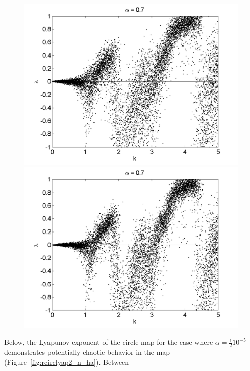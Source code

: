 \begin{figure}[!h]
\includegraphics[width=.5\textwidth]{figs/rcirc_n_lyap_L_05_k_10000.png}\hfill
\includegraphics[width=.5\textwidth]{figs/rcirc_n_lyap_L_07_k_10000.png}\\
\end{figure}

Below, the Lyapunov exponent of the circle map for the case where
$\alpha = \frac{1}{2}10^{-5}$ demonstrates potentially chaotic
behavior in the map (Figure~\ref{fig:rcirclyap2_n_ha}). Between 

